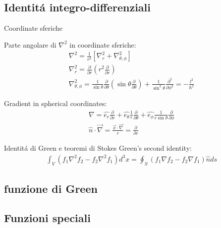 \subsection{Identit\'a integro-differenziali}

\begin{frame}{Coordinate sferiche}

Parte angolare di $\nabla^2$ in coordinate sferiche:
\begin{align*}
&\nabla^2=\frac{1}{r^2}[\nabla_r^2+\nabla_{\theta,\phi}^2]\\
&\nabla_r^2=\frac{\partial}{\partial r}(r^2\frac{\partial}{\partial r})\\ 
&\nabla_{\theta,\phi}^2=\frac{1}{\sin{\theta}}\frac{\partial}{\partial \theta}(\sin{\theta}\frac{\partial}{\partial \theta})+\frac{1}{\sin^2{\theta}}\frac{\partial^2}{\partial\phi^2}=-\frac{l^2}{\hbar^2}
\end{align*}

Gradient in spherical coordinates:
\begin{align*}
&\nabla=\hat{e_{r}}\frac{\partial}{\partial r}+\hat{e_{\theta}}\frac{1}{r}\frac{\partial}{\partial \theta}+\hat{e_{\phi}}\frac{1}{r\sin{\theta}}\frac{\partial}{\partial \phi}\\
&\hat{n}\cdot\vec{\nabla}=\frac{\vec{x}\cdot\vec{\nabla}}{r}=\frac{\partial}{\partial r}
\end{align*}

\end{frame}

\begin{frame}{Identit\'a di Green e teoremi di Stokes}
Green's second identity:
\begin{align*}
&\int_V(f_1\nabla^2f_2-f_2\nabla^2f_1)d^3x=\oint_S(f_1\nabla f_2-f_2\nabla f_1)\hat{n}ds
\end{align*}
\end{frame}

\subsection{funzione di Green}



\subsection{Funzioni speciali}

